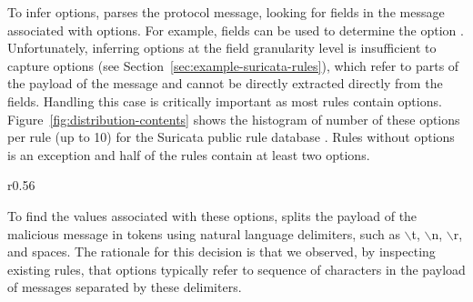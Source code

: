 \documentclass[runningheads]{llncs}
\begin{document}
To infer options, \tname{} parses the protocol message, looking for
fields in the message associated with options. For example, fields
  can be used to determine the option
. Unfortunately, inferring options at the field granularity
level is insufficient to capture  options (see
Section~\ref{sec:example-suricata-rules}), which refer to parts of the
payload of the message and cannot be directly extracted directly from
the fields. Handling this case is critically important as most rules
contain  options. Figure~\ref{fig:distribution-contents} shows
the histogram of number of these options per rule (up to 10) for the
Suricata public rule database . Rules without 
options is an exception and half of the rules contain at least two
 options.
\begin{wrapfigure}[14]{r}{0.56\textwidth}
  \centering
  \vspace{-3ex}
  \caption{\label{fig:distribution-contents}Histogram of number of
     options per rule (up to 10).}
\end{wrapfigure}
To find the values associated with these options, \tname{} splits the
payload of the malicious message in tokens using natural language
delimiters, such as $\backslash$t, $\backslash$n, $\backslash$r, and
spaces. The rationale for this decision is that we observed, by
inspecting existing rules, that  options typically refer to
sequence of characters in the payload of messages separated by these
delimiters. 
\end{document}

